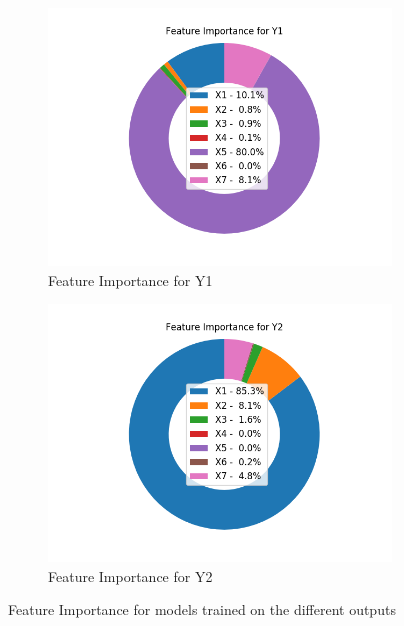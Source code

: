 \documentclass[12pt]{article}
\begin{document}
\begin{figure}[!ht]
\centering
\begin{subfigure}{.5\textwidth}
  \centering
  \includegraphics[width=\linewidth]{images/fiY1}
  \caption{Feature Importance for Y1}
  \label{fig:fiy1} 
\end{subfigure}%
\begin{subfigure}{.5\textwidth}
  \centering
  \includegraphics[width=\linewidth]{images/fiY2}
  \caption{Feature Importance for Y2}
  \label{fig:fiy2}
\end{subfigure}
\caption{Feature Importance for models trained on the different outputs}
\label{fig:fi}
\end{figure}
\end{document}
